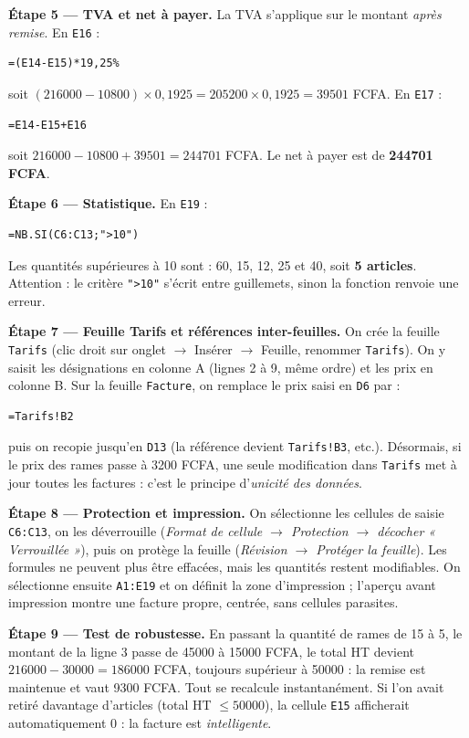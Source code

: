 \documentclass[11pt]{article}
\begin{document}
\begin{exoresolu}
\textbf{Étape 5 — TVA et net à payer.} La TVA s'applique sur le montant \emph{après remise}. En \texttt{E16} :
\begin{lstlisting}
=(E14-E15)*19,25%
\end{lstlisting}
soit $(\num{216000} - \num{10800}) \times 0{,}1925 = \num{205200} \times 0{,}1925 = \num{39501}$ FCFA. En \texttt{E17} :
\begin{lstlisting}
=E14-E15+E16
\end{lstlisting}
soit $\num{216000} - \num{10800} + \num{39501} = \num{244701}$ FCFA. Le net à payer est de \textbf{\num{244701} FCFA}.

\textbf{Étape 6 — Statistique.} En \texttt{E19} :
\begin{lstlisting}
=NB.SI(C6:C13;">10")
\end{lstlisting}
Les quantités supérieures à 10 sont : 60, 15, 12, 25 et 40, soit \textbf{5 articles}. Attention : le critère \texttt{">10"} s'écrit entre guillemets, sinon la fonction renvoie une erreur.

\textbf{Étape 7 — Feuille Tarifs et références inter-feuilles.} On crée la feuille \texttt{Tarifs} (clic droit sur onglet $\to$ Insérer $\to$ Feuille, renommer \texttt{Tarifs}). On y saisit les désignations en colonne A (lignes 2 à 9, même ordre) et les prix en colonne B. Sur la feuille \texttt{Facture}, on remplace le prix saisi en \texttt{D6} par :
\begin{lstlisting}
=Tarifs!B2
\end{lstlisting}
puis on recopie jusqu'en \texttt{D13} (la référence devient \texttt{Tarifs!B3}, etc.). Désormais, si le prix des rames passe à \num{3200} FCFA, une seule modification dans \texttt{Tarifs} met à jour toutes les factures : c'est le principe d'\emph{unicité des données}.

\textbf{Étape 8 — Protection et impression.} On sélectionne les cellules de saisie \texttt{C6:C13}, on les déverrouille (\emph{Format de cellule $\to$ Protection $\to$ décocher « Verrouillée »}), puis on protège la feuille (\emph{Révision $\to$ Protéger la feuille}). Les formules ne peuvent plus être effacées, mais les quantités restent modifiables. On sélectionne ensuite \texttt{A1:E19} et on définit la zone d'impression ; l'aperçu avant impression montre une facture propre, centrée, sans cellules parasites.

\textbf{Étape 9 — Test de robustesse.} En passant la quantité de rames de 15 à 5, le montant de la ligne 3 passe de \num{45000} à \num{15000} FCFA, le total HT devient $\num{216000} - \num{30000} = \num{186000}$ FCFA, toujours supérieur à \num{50000} : la remise est maintenue et vaut \num{9300} FCFA. Tout se recalcule instantanément. Si l'on avait retiré davantage d'articles (total HT $\leq \num{50000}$), la cellule \texttt{E15} afficherait automatiquement 0 : la facture est \emph{intelligente}.
\end{exoresolu}
\end{document}
